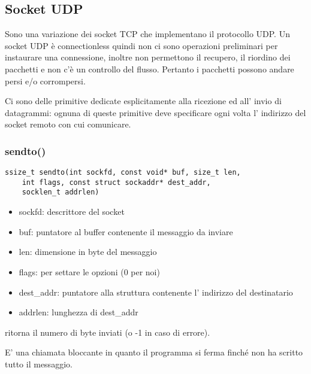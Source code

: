 {{{{{{{\subsection{Socket UDP}
Sono una variazione dei socket TCP che implementano il protocollo UDP.
Un socket UDP è connectionless quindi non ci sono operazioni preliminari per instaurare una connessione, inoltre non permettono il recupero, il riordino dei pacchetti e non c'è un controllo del flusso.
Pertanto i pacchetti possono andare persi e/o corrompersi.

Ci sono delle primitive dedicate esplicitamente alla ricezione ed all' invio di datagrammi:
ognuna di queste primitive deve specificare ogni volta l' indirizzo del socket remoto con cui comunicare.

\subsubsection{sendto()}
\begin{verbatim}
ssize_t sendto(int sockfd, const void* buf, size_t len,
    int flags, const struct sockaddr* dest_addr,
    socklen_t addrlen)
\end{verbatim}
\begin{itemize}
    \item sockfd: descrittore del socket
    \item buf: puntatore al buffer contenente il messaggio da inviare
    \item len: dimensione in byte del messaggio
    \item flags: per settare le opzioni (0 per noi)
    \item dest\_addr: puntatore alla struttura contenente l' indirizzo del destinatario
    \item addrlen: lunghezza di dest\_addr
\end{itemize}
ritorna il numero di byte inviati (o -1 in caso di errore).

E' una chiamata bloccante in quanto il programma si ferma finché non ha scritto tutto il messaggio.


}}}}}}}
